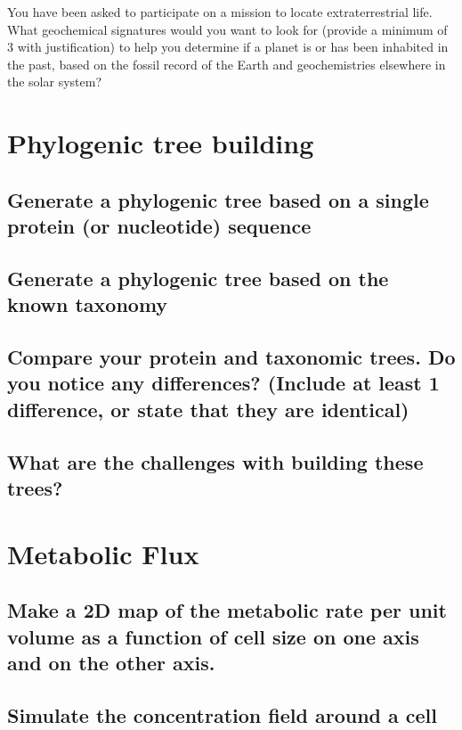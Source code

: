 \documentclass[]{article}
\begin{document}
You have been asked to participate on a mission to locate extraterrestrial life. What geochemical signatures would you want to look for (provide a minimum of 3 with justification) to help you determine if a planet is or has been inhabited in the past, based on the fossil record of the Earth and geochemistries elsewhere in the solar system?

\section{Phylogenic tree building}

\subsection{ Generate a phylogenic tree
	based on a single protein (or
	nucleotide) sequence}

\subsection{ Generate a phylogenic tree
	based on the known taxonomy}

\subsection{ Compare your protein and
	taxonomic trees. Do you notice
	any differences? (Include at
	least 1 difference, or state that
	they are identical)}

\subsection{ What are the challenges with
	building these trees?}

\section{Metabolic Flux}

\subsection{Make a 2D map of the metabolic rate per unit volume as
	a function of cell size on one axis and on the other
	axis.}

\subsection{Simulate the concentration field around a cell}

\printglossaries




\end{document}
